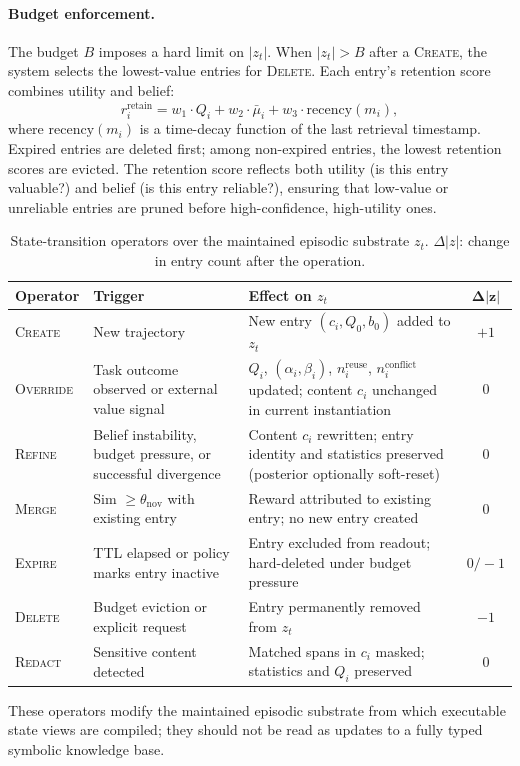 \paragraph{Budget enforcement.}
The budget $B$ imposes a hard limit on $|z_t|$. When $|z_t| > B$ after a \textsc{Create}, the system selects the lowest-value entries for \textsc{Delete}. Each entry's retention score combines utility and belief:
\begin{equation}
\label{eq:retention}
  r_i^{\mathrm{retain}} = w_1 \cdot Q_i + w_2 \cdot \bar{\mu}_i + w_3 \cdot \mathrm{recency}(m_i),
\end{equation}
where $\mathrm{recency}(m_i)$ is a time-decay function of the last retrieval timestamp. Expired entries are deleted first; among non-expired entries, the lowest retention scores are evicted. The retention score reflects both utility (is this entry valuable?) and belief (is this entry reliable?), ensuring that low-value or unreliable entries are pruned before high-confidence, high-utility ones.

\begin{table}[t]
\centering
\caption{State-transition operators over the maintained episodic substrate $z_t$. $\Delta|z|$: change in entry count after the operation.}
\label{tab:operators}
\small
\setlength{\tabcolsep}{4pt}
\begin{tabular}{@{}l p{3.0cm} p{5.0cm} c@{}}
\toprule
\textbf{Operator} & \textbf{Trigger} & \textbf{Effect on $z_t$} & $\boldsymbol{\Delta|z|}$ \\
\midrule
\textsc{Create}
  & New trajectory
  & New entry $(c_i, Q_0, b_0)$ added to $z_t$
  & $+1$ \\[3pt]
\textsc{Override}
  & Task outcome observed or external value signal
  & $Q_i$, $(\alpha_i,\beta_i)$, $n_i^{\mathrm{reuse}}$, $n_i^{\mathrm{conflict}}$ updated; content $c_i$ unchanged in current instantiation
  & $0$ \\[3pt]
\textsc{Refine}
  & Belief instability, budget pressure, or successful divergence
  & Content $c_i$ rewritten; entry identity and statistics preserved (posterior optionally soft-reset)
  & $0$ \\[3pt]
\textsc{Merge}
  & Sim $\geq \theta_{\mathrm{nov}}$ with existing entry
  & Reward attributed to existing entry; no new entry created
  & $0$ \\[3pt]
\textsc{Expire}
  & TTL elapsed or policy marks entry inactive
  & Entry excluded from readout; hard-deleted under budget pressure
  & $0/-1$ \\[3pt]
\textsc{Delete}
  & Budget eviction or explicit request
  & Entry permanently removed from $z_t$
  & $-1$ \\[3pt]
\textsc{Redact}
  & Sensitive content detected
  & Matched spans in $c_i$ masked; statistics and $Q_i$ preserved
  & $0$ \\
\bottomrule
\end{tabular}
\vspace{2pt}

{\footnotesize These operators modify the maintained episodic substrate from which executable state views are compiled; they should not be read as updates to a fully typed symbolic knowledge base.}
\end{table}

